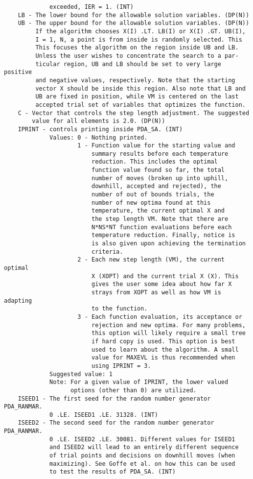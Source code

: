 \begin{verbatim}
             exceeded, IER = 1. (INT)
    LB - The lower bound for the allowable solution variables. (DP(N))
    UB - The upper bound for the allowable solution variables. (DP(N))
         If the algorithm chooses X(I) .LT. LB(I) or X(I) .GT. UB(I),
         I = 1, N, a point is from inside is randomly selected. This
         This focuses the algorithm on the region inside UB and LB.
         Unless the user wishes to concentrate the search to a par-
         ticular region, UB and LB should be set to very large positive
         and negative values, respectively. Note that the starting
         vector X should be inside this region. Also note that LB and
         UB are fixed in position, while VM is centered on the last
         accepted trial set of variables that optimizes the function.
    C - Vector that controls the step length adjustment. The suggested
        value for all elements is 2.0. (DP(N))
    IPRINT - controls printing inside PDA_SA. (INT)
             Values: 0 - Nothing printed.
                     1 - Function value for the starting value and
                         summary results before each temperature
                         reduction. This includes the optimal
                         function value found so far, the total
                         number of moves (broken up into uphill,
                         downhill, accepted and rejected), the
                         number of out of bounds trials, the
                         number of new optima found at this
                         temperature, the current optimal X and
                         the step length VM. Note that there are
                         N*NS*NT function evaluations before each
                         temperature reduction. Finally, notice is
                         is also given upon achieving the termination
                         criteria.
                     2 - Each new step length (VM), the current optimal
                         X (XOPT) and the current trial X (X). This
                         gives the user some idea about how far X
                         strays from XOPT as well as how VM is adapting
                         to the function.
                     3 - Each function evaluation, its acceptance or
                         rejection and new optima. For many problems,
                         this option will likely require a small tree
                         if hard copy is used. This option is best
                         used to learn about the algorithm. A small
                         value for MAXEVL is thus recommended when
                         using IPRINT = 3.
             Suggested value: 1
             Note: For a given value of IPRINT, the lower valued
                   options (other than 0) are utilized.
    ISEED1 - The first seed for the random number generator PDA_RANMAR.
             0 .LE. ISEED1 .LE. 31328. (INT)
    ISEED2 - The second seed for the random number generator PDA_RANMAR.
             0 .LE. ISEED2 .LE. 30081. Different values for ISEED1
             and ISEED2 will lead to an entirely different sequence
             of trial points and decisions on downhill moves (when
             maximizing). See Goffe et al. on how this can be used
             to test the results of PDA_SA. (INT)


\end{verbatim}
